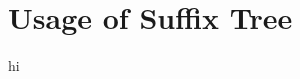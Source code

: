 \documentclass[compress]{beamer}
\begin{document}
\section{Usage of Suffix Tree}
\begin{frame}
    hi
\end{frame}

\end{document}
